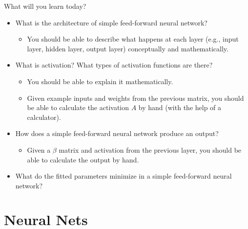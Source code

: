 \documentclass[aspectratio=169,usenames,dvipsnames]{beamer}
\begin{document}
\begin{frame}[t]{What will you learn today?}
\begin{itemize}
\item What is the architecture of simple feed-forward neural network?
	\begin{itemize}
	\item You should be able to describe what happens at each layer (e.g., input layer, hidden layer, output layer) conceptually and mathematically. 
	\end{itemize}
\item What is activation? What types of activation functions are there?
	\begin{itemize}
	\item You should be able to explain it mathematically. 
	\item Given example inputs and weights from the previous matrix, you should be able to calculate the activation $A$ by hand (with the help of a calculator).
	\end{itemize}
\item How does a simple feed-forward neural network produce an output?
	\begin{itemize}
	\item Given a $\beta$ matrix and activation from the previous layer, you should be able to calculate the output by hand. 
	\end{itemize}
\item What do the fitted parameters minimize in a simple feed-forward neural network?
\end{itemize}
\end{frame}

\section{Neural Nets}
\end{document}
